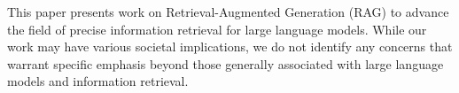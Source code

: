 \documentclass{article}
\theoremstyle{plain}
\theoremstyle{definition}
\theoremstyle{remark}
\begin{document}


This paper presents work on Retrieval-Augmented Generation (RAG) to advance the field of precise information retrieval for large language models. While our work may have various societal implications, we do not identify any concerns that warrant specific emphasis beyond those generally associated with large language models and information retrieval.






\end{document}

